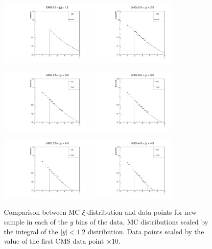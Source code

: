 \documentclass{article}
\begin{document}
\begin{figure}[h!]
\centering
\includegraphics[width = 0.4\textwidth]{plots/xi_CMS.pdf}
\includegraphics[width = 0.4\textwidth]{plots/xi_LHCb_y1.pdf}

\includegraphics[width = 0.4\textwidth]{plots/xi_LHCb_y2.pdf}
\includegraphics[width = 0.4\textwidth]{plots/xi_LHCb_y3.pdf}

\includegraphics[width = 0.4\textwidth]{plots/xi_LHCb_y4.pdf}
\includegraphics[width = 0.4\textwidth]{plots/xi_LHCb_y5.pdf}
\caption{Comparison between MC $\xi$ distribution and data points for new sample in each of the $y$ bins of the data. MC distributions scaled by the integral of the $|y|<1.2$ distribution. Data points scaled by the value of the first CMS data point $\times 10$.}\label{f:xi_comp}
\end{figure}
\end{document}
